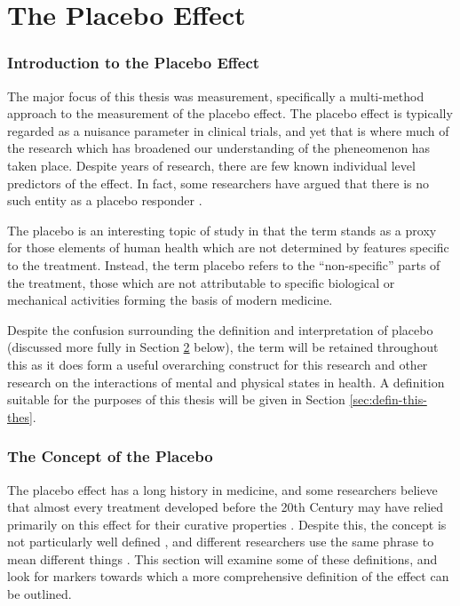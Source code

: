 \part{The Placebo Effect}

\section{Introduction to the Placebo Effect}
\label{sec:intr-plac-effect}


The major focus of this thesis was measurement, specifically a multi-method approach to the measurement of the placebo effect. The placebo effect is typically regarded as a nuisance parameter in clinical trials, and yet that is where much of the research which has broadened our understanding of the pheneomenon has taken place. Despite years of research, there are few known individual level predictors of the effect. In fact, some researchers have argued that there is no such entity as a placebo responder \cite{Kaptchuk2008a} . 

The placebo is an interesting topic of study in that the term stands as a proxy for those elements of human health which are not determined by  features specific to the treatment. Instead, the term placebo refers to the ``non-specific'' parts of the treatment, those which are not attributable to  specific biological or mechanical activities forming the basis of modern medicine. 

Despite the confusion surrounding the definition and interpretation of placebo (discussed more fully in Section \ref{sec:concept-placebo} below), the term will be retained throughout this  as it does form a useful overarching construct for this research and other research on the interactions of mental and physical states in health. A definition suitable for the purposes of this thesis will be given in Section \ref{sec:defin-this-thes}.

\section{The Concept of the Placebo}
\label{sec:concept-placebo}

The placebo effect has a long history in medicine, and some researchers believe that almost every treatment developed before the 20th Century may have relied primarily on this effect for their curative properties \cite{Shapiro1997,Macedo2003} . Despite this, the concept is not particularly well defined , and different researchers use the same phrase to mean different things \cite{Ernst1995b,hrobjartsson1996uncontrollable} . This section will examine some of these definitions, and look for markers towards which  a more comprehensive definition of the effect can be outlined.  

